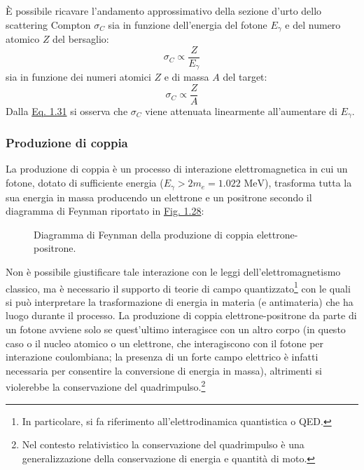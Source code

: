 \documentclass[12pt,a4paper,twoside]{report}
\begin{document}
	\`E possibile ricavare l'andamento approssimativo della sezione d'urto dello scattering Compton $\sigma_{C}$ sia in funzione dell'energia del fotone $E_\gamma$ e del numero atomico $Z$ del bersaglio:
	\begin{equation}
		\sigma_{C}\propto \frac{Z}{E_\gamma}
		\label{eq:sigma_c1}
	\end{equation}
	sia in funzione dei numeri atomici $Z$ e di massa $A$ del target:
	\begin{equation}
		\sigma_{C}\propto \frac{Z}{A}
		\label{eq:sigma_c2}
	\end{equation}
	Dalla \hyperref[eq:sigma_c1]{Eq. 1.31} si osserva che $\sigma_{C}$ viene attenuata linearmente all'aumentare di $E_\gamma$.
	
	\subsubsection{Produzione di coppia}
	La produzione di coppia è un processo di interazione elettromagnetica in cui un fotone, dotato di sufficiente energia ($E_\gamma>2m_e=1.022\mbox{ MeV}$), trasforma tutta la sua energia in massa producendo un elettrone e un positrone secondo il diagramma di Feynman riportato in \hyperref[fig:feynman]{Fig. 1.28}:
	\begin{figure}
		\centering
		\caption{Diagramma di Feynman della produzione di coppia elettrone-positrone.}
		\label{fig:feynman}
	\end{figure}
	Non è possibile giustificare tale interazione con le leggi dell'elettromagnetismo classico, ma è necessario il supporto di teorie di campo quantizzato\footnote{In particolare, si fa riferimento all'elettrodinamica quantistica o QED.} con le quali si può interpretare la trasformazione di energia in materia (e antimateria) che ha luogo durante il processo. La produzione di coppia elettrone-positrone da parte di un fotone avviene solo se quest'ultimo interagisce con un altro corpo (in questo caso o il nucleo atomico o un elettrone, che interagiscono con il fotone per interazione coulombiana; la presenza di un forte campo elettrico è infatti necessaria per consentire la conversione di energia in massa), altrimenti si violerebbe la conservazione del quadrimpulso.\footnote{Nel contesto relativistico la conservazione del quadrimpulso è una generalizzazione della conservazione di energia e quantità di moto.}
	
\end{document}
